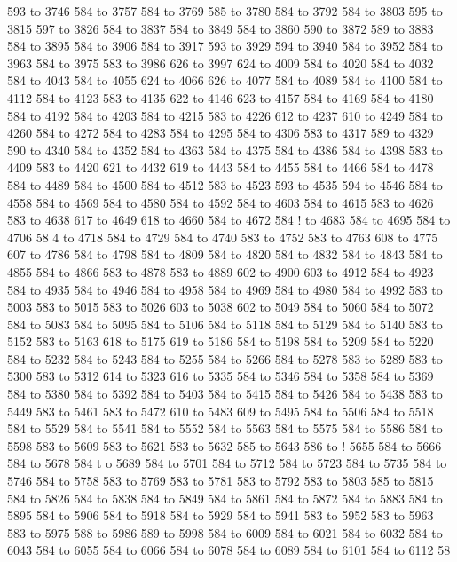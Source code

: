  593 to 3746 584 to 3757 584 to 3769 585 to 3780 584 to 3792 584 to 3803 595 to 3815 597 to 3826 584 to 3837 584 to 3849 584 to 3860 590 to 3872 589 to 3883 584 to 3895 584 to 3906 584 to 3917 593 to 3929 594 to 3940 584 to 3952 584 to 3963 584 to 3975 583 to 3986 626 to 3997 624 to 4009 584 to 4020 584 to 4032 584 to 4043 584 to 4055 624 to 4066 626 to 4077 584 to 4089 584 to 4100 584 to 4112 584 to 4123 583 to 4135 622 to 4146 623 to 4157 584 to 4169 584 to 4180 584 to 4192 584 to 4203 584 to 4215 583 to 4226 612 to 4237 610 to 4249 584 to 4260 584 to 4272 584 to 4283 584 to 4295 584 to 4306 583 to 4317 589 to 4329 590 to 4340 584 to 4352 584 to 4363 584 to 4375 584 to 4386 584 to 4398 583 to 4409 583 to 4420 621 to 4432 619 to 4443 584 to 4455 584 to 4466 584 to 4478 584 to 4489 584 to 4500 584 to 4512 583 to 4523 593 to 4535 594 to 4546 584 to 4558 584 to 4569 584 to 4580 584 to 4592 584 to 4603 584 to 4615 583 to 4626 583 to 4638 617 to 4649 618 to 4660 584 to 4672 584 !
to 4683 584 to 4695 584 to 4706 58
4 to 4718 584 to 4729 584 to 4740 583 to 4752 583 to 4763 608 to 4775 607 to 4786 584 to 4798 584 to 4809 584 to 4820 584 to 4832 584 to 4843 584 to 4855 584 to 4866 583 to 4878 583 to 4889 602 to 4900 603 to 4912 584 to 4923 584 to 4935 584 to 4946 584 to 4958 584 to 4969 584 to 4980 584 to 4992 583 to 5003 583 to 5015 583 to 5026 603 to 5038 602 to 5049 584 to 5060 584 to 5072 584 to 5083 584 to 5095 584 to 5106 584 to 5118 584 to 5129 584 to 5140 583 to 5152 583 to 5163 618 to 5175 619 to 5186 584 to 5198 584 to 5209 584 to 5220 584 to 5232 584 to 5243 584 to 5255 584 to 5266 584 to 5278 583 to 5289 583 to 5300 583 to 5312 614 to 5323 616 to 5335 584 to 5346 584 to 5358 584 to 5369 584 to 5380 584 to 5392 584 to 5403 584 to 5415 584 to 5426 584 to 5438 583 to 5449 583 to 5461 583 to 5472 610 to 5483 609 to 5495 584 to 5506 584 to 5518 584 to 5529 584 to 5541 584 to 5552 584 to 5563 584 to 5575 584 to 5586 584 to 5598 583 to 5609 583 to 5621 583 to 5632 585 to 5643 586 to !
5655 584 to 5666 584 to 5678 584 t
o 5689 584 to 5701 584 to 5712 584 to 5723 584 to 5735 584 to 5746 584 to 5758 583 to 5769 583 to 5781 583 to 5792 583 to 5803 585 to 5815 584 to 5826 584 to 5838 584 to 5849 584 to 5861 584 to 5872 584 to 5883 584 to 5895 584 to 5906 584 to 5918 584 to 5929 584 to 5941 583 to 5952 583 to 5963 583 to 5975 588 to 5986 589 to 5998 584 to 6009 584 to 6021 584 to 6032 584 to 6043 584 to 6055 584 to 6066 584 to 6078 584 to 6089 584 to 6101 584 to 6112 58
